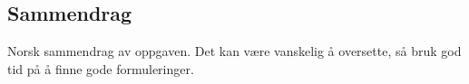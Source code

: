 

\begin{otherlanguage}{norsk}
	\section{Sammendrag}
	
	
	Norsk sammendrag av oppgaven. Det kan være vanskelig å oversette, så bruk god tid på å finne gode formuleringer.
\end{otherlanguage}
